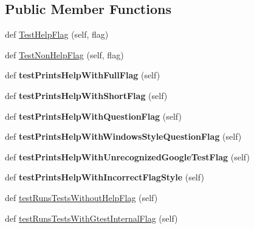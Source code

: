 \subsection*{Public Member Functions}
\begin{DoxyCompactItemize}
\item 
def \hyperlink{classgtest__help__test_1_1GTestHelpTest_a26cc1a64bd67278252ebfcd0ac0dca0c}{Test\+Help\+Flag} (self, flag)
\item 
def \hyperlink{classgtest__help__test_1_1GTestHelpTest_a03ffa91ecf6193ed2ed80b53933112ab}{Test\+Non\+Help\+Flag} (self, flag)
\item 
def {\bfseries test\+Prints\+Help\+With\+Full\+Flag} (self)\hypertarget{classgtest__help__test_1_1GTestHelpTest_ad91b46ad4506ff52b337b63f6b6c2ad1}{}\label{classgtest__help__test_1_1GTestHelpTest_ad91b46ad4506ff52b337b63f6b6c2ad1}

\item 
def {\bfseries test\+Prints\+Help\+With\+Short\+Flag} (self)\hypertarget{classgtest__help__test_1_1GTestHelpTest_a3dd96058d093a89350769b4e2cc36563}{}\label{classgtest__help__test_1_1GTestHelpTest_a3dd96058d093a89350769b4e2cc36563}

\item 
def {\bfseries test\+Prints\+Help\+With\+Question\+Flag} (self)\hypertarget{classgtest__help__test_1_1GTestHelpTest_aafd4d1857c2538c8b1f7cc5a5d1e38b4}{}\label{classgtest__help__test_1_1GTestHelpTest_aafd4d1857c2538c8b1f7cc5a5d1e38b4}

\item 
def {\bfseries test\+Prints\+Help\+With\+Windows\+Style\+Question\+Flag} (self)\hypertarget{classgtest__help__test_1_1GTestHelpTest_a7be99cd30193e2eecf79f9d65f561afc}{}\label{classgtest__help__test_1_1GTestHelpTest_a7be99cd30193e2eecf79f9d65f561afc}

\item 
def {\bfseries test\+Prints\+Help\+With\+Unrecognized\+Google\+Test\+Flag} (self)\hypertarget{classgtest__help__test_1_1GTestHelpTest_a701abb8f34df726b9129d7654cb32066}{}\label{classgtest__help__test_1_1GTestHelpTest_a701abb8f34df726b9129d7654cb32066}

\item 
def {\bfseries test\+Prints\+Help\+With\+Incorrect\+Flag\+Style} (self)\hypertarget{classgtest__help__test_1_1GTestHelpTest_ab8d379bbb0da7403ced599f4ee498728}{}\label{classgtest__help__test_1_1GTestHelpTest_ab8d379bbb0da7403ced599f4ee498728}

\item 
def \hyperlink{classgtest__help__test_1_1GTestHelpTest_ae7831f92e8e3763c07afb908915b3d20}{test\+Runs\+Tests\+Without\+Help\+Flag} (self)
\item 
def \hyperlink{classgtest__help__test_1_1GTestHelpTest_a0ebec2e3154d22a63e362d2196f9c638}{test\+Runs\+Tests\+With\+Gtest\+Internal\+Flag} (self)
\end{DoxyCompactItemize}


